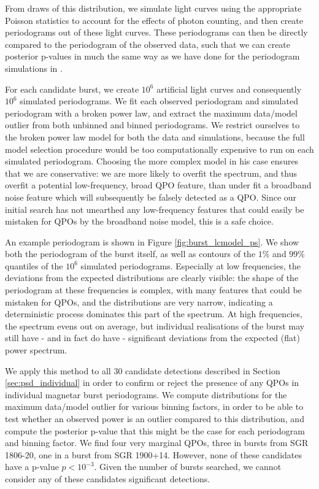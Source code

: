 \documentclass[numberedappendix]{emulateapj}
\begin{document}
From draws of this distribution, we simulate light curves using the appropriate Poisson statistics to account for the effects of photon counting, and then create periodograms out of these light curves. These periodograms can then be directly compared to the periodogram of the observed data, such that we can create posterior p-values in much the same way as we have done for the periodogram simulations in \citep{huppenkothen2013}. 

For each candidate burst, we create $10^6$ artificial light curves and consequently $10^6$ simulated periodograms. We fit each observed periodogram and simulated periodogram with a broken power law, and extract the maximum data/model outlier from both unbinned and binned periodograms. We restrict ourselves to the broken power law model for both the data and simulations, because the full model selection procedure would be too computationally expensive to run on each simulated periodogram. Choosing the more complex model in his case ensures that we are conservative: we are more likely to overfit the spectrum, and thus overfit a potential low-frequency, broad QPO feature, than under fit a broadband noise feature which will subsequently be falsely detected as a QPO. Since our initial search has not unearthed any low-frequency features that could easily be mistaken for QPOs by the broadband noise model, this is a safe choice.

An example periodogram is shown in Figure \ref{fig:burst_lcmodel_ps}. We show both the periodogram of the burst itself, as well as contours of the $1\%$ and $99\%$ quantiles of the $10^6$ simulated periodograms. Especially at low frequencies, the deviations from the expected distributions are clearly visible: the shape of the periodogram at these frequencies is complex, with many features that could be mistaken for QPOs, and the distributions are very narrow, indicating a deterministic process dominates this part of the spectrum. At high frequencies, the spectrum evens out on average, but individual realisations of the burst may still have - and in fact do have - significant deviations from the expected (flat) power spectrum.

We apply this method to all $30$ candidate detections described in Section \ref{sec:psd_individual} in order to confirm or reject the presence of any QPOs in individual magnetar burst periodograms. We compute distributions for the maximum data/model outlier for various binning factors, in order to be able to test whether an observed power is an outlier compared to this distribution, and compute the posterior p-value that this might be the case for each periodogram and binning factor. 
We find four very marginal QPOs, three in bursts from SGR 1806-20, one in a burst from SGR 1900+14. However, none of these candidates have a p-value $p < 10^{-3}$. Given the number of bursts searched, we cannot consider any of these candidates significant detections.
\end{document}
